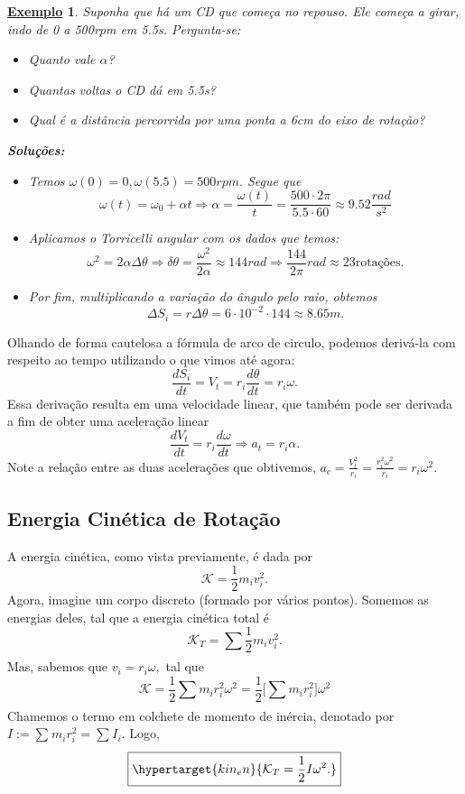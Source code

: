 \documentclass{article}
\newtheorem{example}{\underline{Exemplo}}
\begin{document}
\begin{example}
  Suponha que há um CD que começa no repouso. Ele começa a girar, indo de 0 a 500rpm em 5.5s. Pergunta-se:
 \begin{itemize}
   \item[a)] Quanto vale \(\alpha \)?
     \item[b)] Quantas voltas o CD dá em 5.5s?
       \item[c)] Qual é a distância percorrida por uma ponta a 6cm do eixo de rotação?
 \end{itemize}

 \textbf{Soluções:}
 \begin{itemize}
   \item[a)] Temos \(\omega (0) = 0, \omega (5.5) = 500rpm.\) Segue que 
     \[
       \omega(t) = \omega_{0} + \alpha t \Rightarrow \alpha  = \frac{\omega (t)}{t} = \frac{500 \cdot 2\pi}{5.5 \cdot 60}\approx 9.52 \frac{rad}{s^{2}}
     \]

    \item[b)] Aplicamos o Torricelli angular com os dados que temos: 
      \[
        \omega^{2} = 2\alpha \Delta \theta \Rightarrow \delta \theta = \frac{\omega^{2}}{2\alpha }\approx 144 rad \Rightarrow \frac{144}{2\pi}rad\approx 23\text{rotações}.
      \]

    \item[c)] Por fim, multiplicando a variação do ângulo pelo raio, obtemos 
      \[
        \Delta S_{i} = r\Delta \theta = 6 \cdot 10^{-2}\cdot 144\approx 8.65m.
      \]
 \end{itemize}
\end{example}

  Olhando de forma cautelosa a fórmula de arco de circulo, podemos derivá-la com respeito ao tempo utilizando o que vimos até agora: 
    \[
      \frac{dS_{i}}{dt} = V_{t} = r_{i}\frac{d\theta }{dt} = r_{i}\omega.
    \]
  Essa derivação resulta em uma velocidade linear, que também pode ser derivada a fim de obter uma aceleração linear 
    \[
      \frac{dV_{t}}{dt} = r_{i}\frac{d\omega }{dt} \Rightarrow a_{t} = r_{i}\alpha.
    \]
    Note a relação entre as duas acelerações que obtivemos, \(a_{c} = \frac{V_{t}^{2}}{r_{i}}= \frac{r_{i}^{2}\omega^{2}}{r_{i}} = r_{i}\omega^{2}.\)

\subsection{Energia Cinética de Rotação}
  A energia cinética, como vista previamente, é dada por 
    \[
      \mathcal{K} = \frac{1}{2}m_{i}v_{i}^{2}.
    \]
  Agora, imagine um corpo discreto (formado por vários pontos). Somemos as energias deles, tal que a energia cinética total é 
    \[
      \mathcal{K}_{T} = \sum\limits_{}^{}\frac{1}{2}m_{i}v_{i}^{2}.
    \]
  Mas, sabemos que \(v_{i} = r_{i}\omega, \) tal que 
    \[
      \mathcal{K} = \frac{1}{2}\sum\limits_{}^{}m_{i}r_{i}^{2}\omega^{2} = \frac{1}{2}\biggl[\sum\limits_{}^{}m_{i}r_{i}^{2}\biggr]\omega^{2}
    \]
  Chamemos o termo em colchete de momento de inércia, denotado por \(I:= \sum\limits_{}^{}m_{i}r_{i}^{2} = \sum\limits_{}^{}I_{i}\). Logo, 
    \[
      \boxed{\hypertarget{kin_en}{\mathcal{K}_{T} = \frac{1}{2}I\omega^{2}.}}
    \]
\newpage
\end{document}
